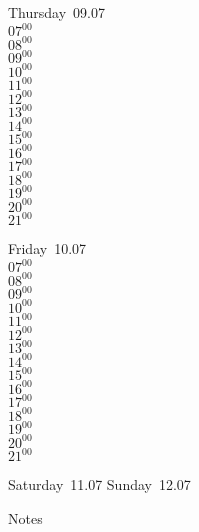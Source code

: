 \documentclass[11pt,a4paper]{book}\usepackage[]{graphicx}\usepackage[]{color}
\begin{document}
\clearpage
\begin{headerbox}
\end{headerbox}
\begin{weekdaybox}
  Thursday~09.07\\
  { 
  \vfill
  $07^{00}$\\
$08^{00}$\\
$09^{00}$\\
$10^{00}$\\
$11^{00}$\\
$12^{00}$\\
$13^{00}$\\
$14^{00}$\\
$15^{00}$\\
$16^{00}$\\
$17^{00}$\\
$18^{00}$\\
$19^{00}$\\
$20^{00}$\\
$21^{00}$\\
  }
\end{weekdaybox} 
\begin{weekdaybox}
  Friday~10.07\\
  { 
  \vfill
  $07^{00}$\\
$08^{00}$\\
$09^{00}$\\
$10^{00}$\\
$11^{00}$\\
$12^{00}$\\
$13^{00}$\\
$14^{00}$\\
$15^{00}$\\
$16^{00}$\\
$17^{00}$\\
$18^{00}$\\
$19^{00}$\\
$20^{00}$\\
$21^{00}$\\
  }
\end{weekdaybox}
\begin{weekendbox}
  Saturday~11.07
  \tcblower
  Sunday~12.07
\end{weekendbox} %
\begin{notebox}
  Notes
\end{notebox}
\clearpage
\end{document}
